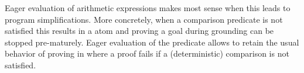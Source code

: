 Eager evaluation of arithmetic expressions makes most sense when this leads to program simplifications. More concretely, when a comparison predicate is not satisfied this results in a  atom and proving a goal during grounding can be stopped pre-maturely.
Eager evaluation of the  predicate allows \dcproblogsty to retain the usual behavior of proving in \problogsty where a proof fails if a (deterministic) comparison is not satisfied.

















